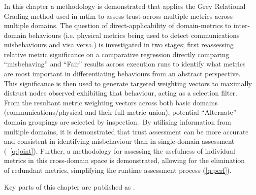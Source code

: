 
\subsubsection{}

In this chapter a methodology is demonstrated that applies the Grey Relational Grading method used in \gls{mtfm} to assess trust across multiple metrics across multiple domains.
The question of direct-applicability of domain-metrics to inter-domain behaviours (i.e. physical metrics being used to detect communications misbehaviours and visa versa.) is investigated in two stages; first reassessing relative metric significance on a comparative regression directly comparing ``misbehaving'' and ``Fair'' results across execution runs to identify what metrics are most important in  differentiating behaviours from an abstract perspective. 
This significance is then used to generate targeted weighting vectors to maximally distrust nodes observed exhibiting that behaviour, acting as a selection filter.
From the resultant metric weighting vectors across both basic domains (communications/physical and their full metric union), potential ``Alternate'' domain groupings are selected by inspection.\
By utilising information from multiple domains, it is demonstrated that trust assessment can be more accurate and consistent in identifying misbehaviour than in single-domain assessment (~\autoref{q:joint}).
Further, a methodology for assessing the usefulness of individual metrics in this cross-domain space is demonstrated, allowing for the elimination of redundant metrics, simplifying the runtime assessment process (\autoref{q:perf}).

{\sloppy \raggedright
Key parts of this chapter are published as .
}


